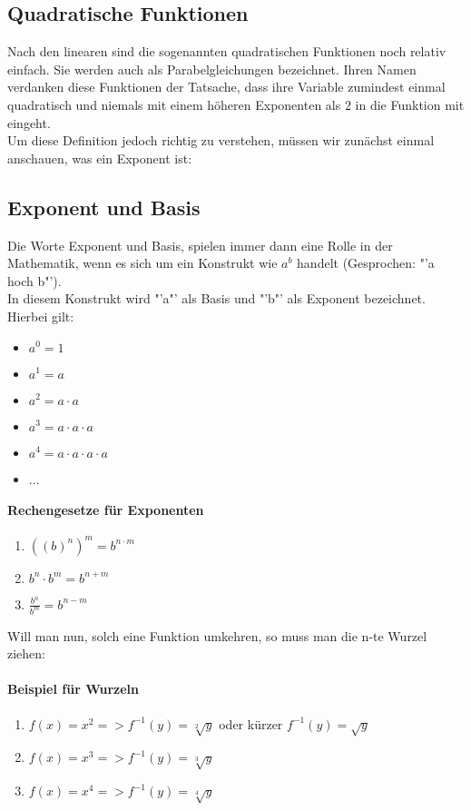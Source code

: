 \subsection{Quadratische Funktionen}
Nach den linearen sind die sogenannten quadratischen Funktionen noch relativ einfach. Sie werden auch als Parabelgleichungen bezeichnet. Ihren Namen verdanken diese Funktionen der Tatsache, dass ihre Variable zumindest einmal quadratisch und niemals mit einem höheren Exponenten als $2$ in die Funktion mit eingeht.\\
Um diese Definition jedoch richtig zu verstehen, müssen wir zunächst einmal anschauen, was ein Exponent ist:

\subsection{Exponent und Basis}
Die Worte Exponent und Basis, spielen immer dann eine Rolle in der Mathematik, wenn es sich um ein Konstrukt wie $a^b$ handelt (Gesprochen: "'a hoch b"').\\
In diesem Konstrukt wird "'a"' als Basis und "'b"' als Exponent bezeichnet. Hierbei gilt:
\begin{itemize}
	\item $a^0 = 1$
	\item $a^1 = a$
	\item $a^2 = a \cdot a$
	\item $a^3 = a \cdot a \cdot a$
	\item $a^4 = a \cdot a \cdot a \cdot a$
	\item $\ldots$
\end{itemize}

\paragraph{Rechengesetze für Exponenten}
\begin{enumerate}
	\item $((b)^n)^m = b^{n \cdot m}$
	\item $b^n \cdot b^m = b^{n+m}$
	\item $\frac{b^n}{b^m} = b^{n-m}$
\end{enumerate}

\noindent Will man nun, solch eine Funktion umkehren, so muss man die n-te Wurzel ziehen:
\paragraph{Beispiel für Wurzeln}
\begin{enumerate}
	\item $f(x)=x^2 => f^{-1}(y)=\sqrt[2]{y}$ oder kürzer $f^{-1}(y)=\sqrt{y}$
	\item $f(x)=x^3 => f^{-1}(y)=\sqrt[3]{y}$
	\item $f(x)=x^4 => f^{-1}(y)=\sqrt[4]{y}$
\end{enumerate}

